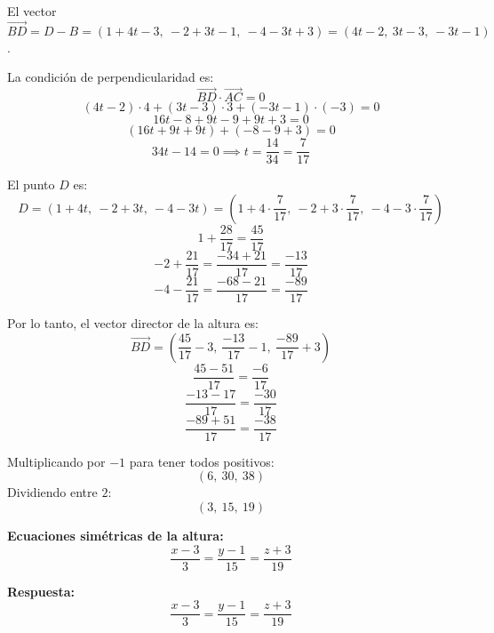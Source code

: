 \begin{prob}
\begin{myproof}
El vector $\overrightarrow{BD} = D - B = (1 + 4t - 3,\ -2 + 3t - 1,\ -4 - 3t + 3) = (4t - 2,\ 3t - 3,\ -3t - 1)$.

La condición de perpendicularidad es:
\[
\overrightarrow{BD} \cdot \overrightarrow{AC} = 0
\]
\[
(4t - 2) \cdot 4 + (3t - 3) \cdot 3 + (-3t - 1) \cdot (-3) = 0
\]
\[
16t - 8 + 9t - 9 + 9t + 3 = 0
\]
\[
(16t + 9t + 9t) + (-8 - 9 + 3) = 0
\]
\[
34t - 14 = 0 \implies t = \frac{14}{34} = \frac{7}{17}
\]

El punto $D$ es:
\[
D = (1 + 4t,\ -2 + 3t,\ -4 - 3t) = \left(1 + 4 \cdot \frac{7}{17},\ -2 + 3 \cdot \frac{7}{17},\ -4 - 3 \cdot \frac{7}{17}\right)
\]
\[
1 + \frac{28}{17} = \frac{45}{17}
\]
\[
-2 + \frac{21}{17} = \frac{-34 + 21}{17} = \frac{-13}{17}
\]
\[
-4 - \frac{21}{17} = \frac{-68 - 21}{17} = \frac{-89}{17}
\]

Por lo tanto, el vector director de la altura es:
\[
\overrightarrow{BD} = \left(\frac{45}{17} - 3,\ \frac{-13}{17} - 1,\ \frac{-89}{17} + 3\right)
\]
\[
\frac{45 - 51}{17} = \frac{-6}{17}
\]
\[
\frac{-13 - 17}{17} = \frac{-30}{17}
\]
\[
\frac{-89 + 51}{17} = \frac{-38}{17}
\]

Multiplicando por $-1$ para tener todos positivos:
\[
(6,\ 30,\ 38)
\]
Dividiendo entre $2$:
\[
(3,\ 15,\ 19)
\]

\textbf{Ecuaciones simétricas de la altura:}
\[
\frac{x - 3}{3} = \frac{y - 1}{15} = \frac{z + 3}{19}
\]

\textbf{Respuesta:}
\[
\boxed{
\frac{x - 3}{3} = \frac{y - 1}{15} = \frac{z + 3}{19}
}
\]
\end{myproof}

\end{prob}

